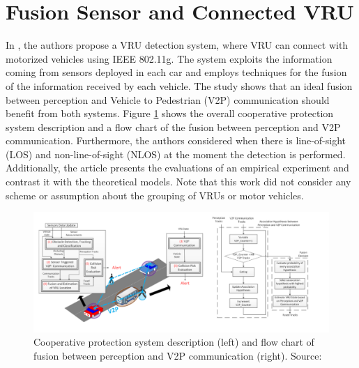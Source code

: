 \section{Fusion Sensor and Connected VRU}

In \cite{Merdrignac2017}, the authors propose a VRU detection system, where VRU can connect with motorized vehicles using IEEE 802.11g. The system exploits the information coming from sensors deployed in each car and employs techniques for the fusion of the information received by each vehicle. The study shows that an ideal fusion between perception and Vehicle to Pedestrian (V2P) communication should benefit from both systems. Figure \ref{fig:Merd} shows the overall cooperative protection system description and a flow chart of the fusion between perception and V2P communication. Furthermore, the authors considered when there is line-of-sight (LOS) and non-line-of-sight (NLOS) at the moment the detection is performed. Additionally, the article presents the evaluations of an empirical experiment and contrast it with the theoretical models. Note that this work did not consider any scheme or assumption about the grouping of VRUs or motor vehicles.

\begin{figure}[ht]
    \centering
    \includegraphics[width=16cm]{FIGURES/Fig1.png}
    \caption{Cooperative protection system description (left) and flow chart of fusion between perception and V2P communication (right). Source: \cite{Merdrignac2017}}
    \label{fig:Merd}
\end{figure}


